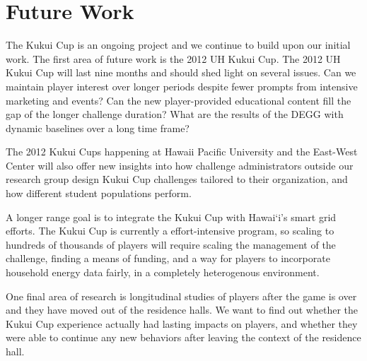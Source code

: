 \documentclass[10pt, conference, compsocconf]{IEEEtran}
\newcommand{\Hawaii}{Hawai`i\xspace}
\begin{document}
%


\section{Future Work}

The Kukui Cup is an ongoing project and we continue to build upon our initial work. The first area of future work is the 2012 UH Kukui Cup. The 2012 UH Kukui Cup will last nine months and should shed light on several issues. Can we  maintain player interest over longer periods despite fewer prompts from intensive marketing and events? Can the new player-provided educational content fill the gap of the longer challenge duration? What are the results of the DEGG with dynamic baselines over a long time frame?

The 2012 Kukui Cups happening at Hawaii Pacific University and the East-West Center will also offer new insights into how challenge administrators outside our research group design Kukui Cup challenges tailored to their organization, and how different student populations perform.


A longer range goal is to integrate the Kukui Cup with \Hawaii's smart grid efforts. The Kukui Cup is currently a effort-intensive program, so scaling to hundreds of thousands of players will require scaling the management of the challenge, finding a means of funding, and a way for players to incorporate household energy data fairly, in a completely heterogenous environment.

One final area of research is longitudinal studies of players after the game is over and they have moved out of the residence halls. We want to find out whether the Kukui Cup experience actually had lasting impacts on players, and whether they were able to continue any new behaviors after leaving the context of the residence hall.
\end{document}
